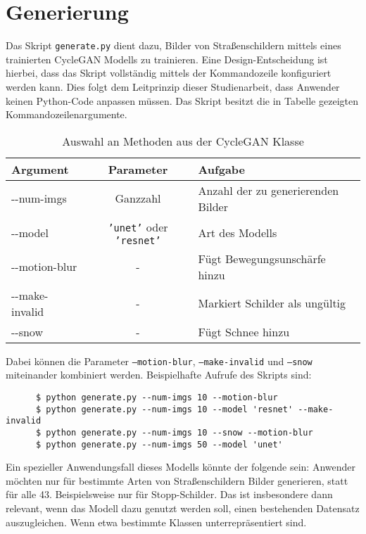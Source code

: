 \section{Generierung}
Das Skript \texttt{generate.py} dient dazu, Bilder von Straßenschildern mittels eines trainierten \ac{CycleGAN} Modells zu trainieren. Eine Design-Entscheidung ist hierbei, dass das Skript vollständig mittels der Kommandozeile konfiguriert werden kann. Dies folgt dem Leitprinzip dieser Studienarbeit, dass Anwender keinen Python-Code anpassen müssen. Das Skript besitzt die in Tabelle \label{tab:generate-cli} gezeigten Kommandozeilenargumente.

\begin{table}[h]
   \centering
   \begin{tabular}{|l|c|l|}
   \hline
   \textbf{Argument} & \textbf{Parameter} & \textbf{Aufgabe} \\ \hline \hline
   -{}-num-imgs & Ganzzahl & Anzahl der zu generierenden Bilder \\ \hline
   -{}-model & \texttt{'unet'} oder \texttt{'resnet'} & Art des Modells \\ \hline
   -{}-motion-blur & - & Fügt Bewegungsunschärfe hinzu \\ \hline
   -{}-make-invalid & - & Markiert Schilder als ungültig \\ \hline
   -{}-snow & - & Fügt Schnee hinzu \\
   \hline
   \end{tabular}
   \caption{Auswahl an Methoden aus der CycleGAN Klasse}
   \label{tab:generate-cli}
\end{table}

Dabei können die Parameter \texttt{--motion-blur}, \texttt{--make-invalid} und \texttt{--snow} miteinander kombiniert werden. Beispielhafte Aufrufe des Skripts sind:

\begin{code}
   \begin{verbatim}
      $ python generate.py --num-imgs 10 --motion-blur
      $ python generate.py --num-imgs 10 --model 'resnet' --make-invalid
      $ python generate.py --num-imgs 10 --snow --motion-blur
      $ python generate.py --num-imgs 50 --model 'unet'
   \end{verbatim}
\end{code}

Ein spezieller Anwendungsfall dieses Modells könnte der folgende sein: Anwender möchten nur für bestimmte Arten von Straßenschildern Bilder generieren, statt für alle 43. Beispielsweise nur für Stopp-Schilder. Das ist insbesondere dann relevant, wenn das Modell dazu genutzt werden soll, einen bestehenden Datensatz auszugleichen. Wenn etwa bestimmte Klassen unterrepräsentiert sind.

